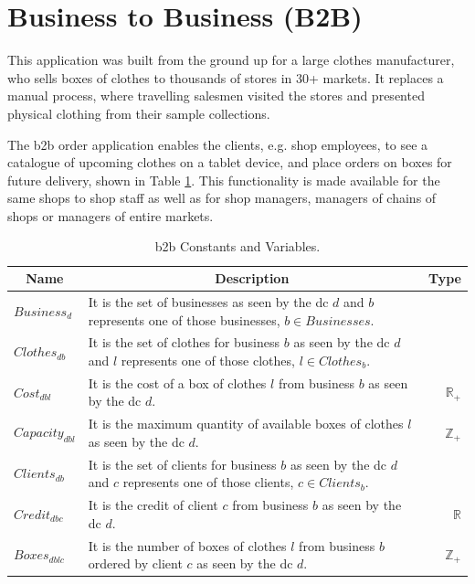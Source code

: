 \section{Business to Business (B2B)}
This application was built from the ground up for a large clothes manufacturer, who sells boxes of clothes to thousands of stores in 30+ markets. It replaces a manual process, where travelling salesmen visited the stores and presented physical clothing from their sample collections.

The \gls{b2b} order application enables the clients, e.g. shop employees, to see a catalogue of upcoming clothes on a tablet device, and place orders on boxes for future delivery, shown in Table \ref{tab:b2b_constants_variables}. This functionality is made available for the same shops to shop staff as well as for shop managers, managers of chains of shops or managers of entire markets.
\begin{table}[!ht]
	\begin{tabular}{|p{2.4cm}|p{13.2cm}|r| }
		\hline
			\multicolumn{1}{|c|}{Name} & \multicolumn{1}{c|}{Description} & \multicolumn{1}{c|}{Type} \\
		\hline
		\hline
			$Business_{d}$ & It is the set of businesses as seen by the \gls{dc} $d$ and $b$ represents one of those businesses, $b \in Businesses$. &  \\
		\hline
			$Clothes_{db}$ & It is the set of clothes for business $b$ as seen by the \gls{dc} $d$ and $l$ represents one of those clothes, $l \in Clothes_{b}$. & \\
		\hline
			$Cost_{dbl}$ & It is the cost of a box of clothes $l$ from business $b$ as seen by the \gls{dc} $d$. & $\mathbb{R}_{+}$ \\
		\hline
			$Capacity_{dbl}$ & It is the maximum quantity of available boxes of clothes $l$ as seen by the \gls{dc} $d$. &  $\mathbb{Z}_{+}$ \\
		\hline
			$Clients_{db}$ & It is the set of clients for business $b$ as seen by the \gls{dc} $d$ and $c$ represents one of those clients, $c \in Clients_{b}$. & \\
		\hline
			$Credit_{dbc}$ & It is the credit of client $c$ from business $b$ as seen by the \gls{dc} $d$. & $\mathbb{R}$ \\
		\hline
			$Boxes_{dblc}$ & It is the number of boxes of clothes $l$ from business $b$ ordered by client $c$ as seen by the \gls{dc} $d$. & $\mathbb{Z}_{+}$ \\
		\hline
	\end{tabular}
	
	\caption{\gls{b2b} Constants and Variables.}
	\label{tab:b2b_constants_variables}
\end{table}

